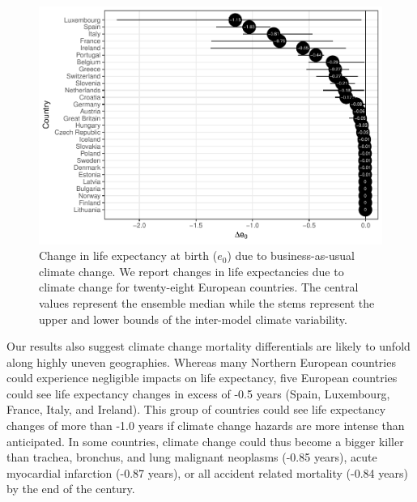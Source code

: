 \documentclass[12pt,]{article}
\makeatletter
\def\maxwidth{\ifdim\Gin@nat@width>\linewidth\linewidth
\else\Gin@nat@width\fi}
\let\Oldincludegraphics\includegraphics
\renewcommand{\includegraphics}[1]{\Oldincludegraphics[width=\maxwidth]{#1}}
\makeatother
\begin{document}
\begin{figure}
\centering
\includegraphics{MS-cclifeexpec_files/figure-latex/figure1-1.pdf}
\caption{Change in life expectancy at birth (\(e_0\)) due to
business-as-usual climate change. We report changes in life expectancies
due to climate change for twenty-eight European countries. The central
values represent the ensemble median while the stems represent the upper
and lower bounds of the inter-model climate variability.\label{figure1}}
\end{figure}

Our results also suggest climate change mortality differentials are
likely to unfold along highly uneven geographies. Whereas many Northern
European countries could experience negligible impacts on life
expectancy, five European countries could see life expectancy changes in
excess of -0.5 years (Spain, Luxembourg, France, Italy, and Ireland).
This group of countries could see life expectancy changes of more than
-1.0 years if climate change hazards are more intense than anticipated.
In some countries, climate change could thus become a bigger killer than
trachea, bronchus, and lung malignant neoplasms (-0.85 years), acute
myocardial infarction (-0.87 years), or all accident related mortality
(-0.84 years) \citep{arias2013united} by the end of the century.
\end{document}
